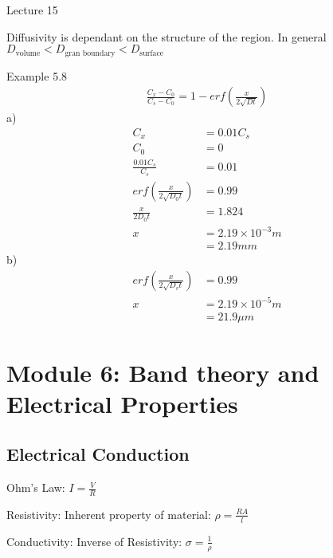 \documentclass{article}
\begin{document}
\Huge
Lecture 15

\normalsize

Diffusivity is dependant on the structure of the region.
In general $D_\text{volume} < D_\text{gran boundary} < D_\text{surface}$

Example 5.8
\begin{equation}
    \begin{split}
        \frac{C_x -C_0}{C_s-C_0} = 1 - erf(\frac{x}{2\sqrt{Dt}})
    \end{split}
\end{equation}
a)
\begin{equation}
    \begin{split}
        C_x &= 0.01 C_s \\
        C_0 &= 0 \\
        \frac{0.01 C_s}{C_s} &= 0.01 \\
        erf(\frac{x}{2\sqrt{D_0t}}) &= 0.99 \\
        \frac{x}{2D_0t} &= 1.824 \\
        x &= 2.19 \times 10^{-3} m \\
        &= 2.19 mm
    \end{split}
\end{equation}
b)
\begin{equation}
    \begin{split}
        erf(\frac{x}{2\sqrt{D_v t}}) &= 0.99 \\
        x &= 2.19 \times 10^{-5} m \\
        &= 21.9 \mu m
    \end{split}
\end{equation}

\section{Module 6: Band theory and Electrical Properties}

\subsection{Electrical Conduction}
Ohm's Law: $ I = \frac{V}{R} $

Resistivity: Inherent property of material: $\rho = \frac{RA}{l}$

Conductivity: Inverse of Resistivity: $\sigma = \frac{1}{\rho}$
\end{document}
